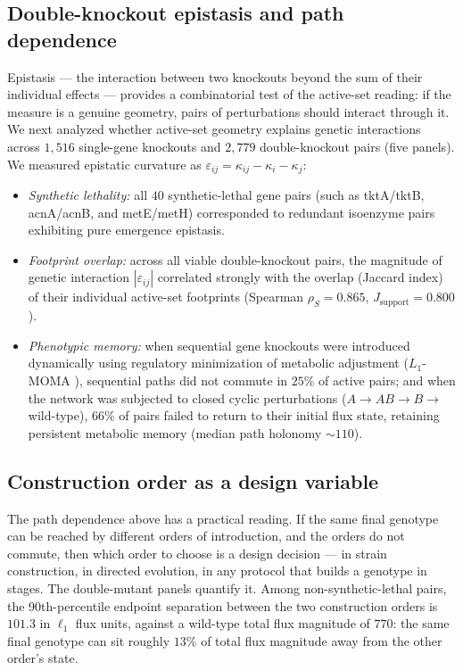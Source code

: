 \documentclass[11pt,a4paper]{article}
\theoremstyle{plain}
\theoremstyle{definition}
\theoremstyle{remark}
\begin{document}
\subsection{Double-knockout epistasis and path dependence}
Epistasis --- the interaction between two knockouts beyond the sum of
their individual effects --- provides a combinatorial test of the
active-set reading: if the measure is a genuine geometry, pairs of
perturbations should interact through it. We next analyzed whether
active-set geometry explains genetic interactions across $1{,}516$
single-gene knockouts and $2{,}779$ double-knockout pairs (five
panels). We measured epistatic curvature as
$\varepsilon_{ij} = \kappa_{ij} - \kappa_i - \kappa_j$:
\begin{itemize}
\item \emph{Synthetic lethality:} all $40$ synthetic-lethal gene pairs
      (such as tktA/tktB, acnA/acnB, and metE/metH) corresponded to
      redundant isoenzyme pairs exhibiting pure emergence epistasis.
\item \emph{Footprint overlap:} across all viable double-knockout
      pairs, the magnitude of genetic interaction $|\varepsilon_{ij}|$
      correlated strongly with the overlap (Jaccard index) of their
      individual active-set footprints (Spearman $\rho_S = 0.865$,
      $J_{\mathrm{support}} = 0.800$).
\item \emph{Phenotypic memory:} when sequential gene knockouts were
      introduced dynamically using regulatory minimization of
      metabolic adjustment ($L_1$-MOMA \citep{segre2002}), sequential
      paths did not commute in $25\%$ of active pairs; and when the
      network was subjected to closed cyclic perturbations
      ($A \to AB \to B \to$ wild-type), $66\%$ of pairs failed to
      return to their initial flux state, retaining persistent
      metabolic memory (median path holonomy $\sim 110$).
\end{itemize}

\subsection{Construction order as a design variable}\label{sec:order}

The path dependence above has a practical reading. If the same
final genotype can be reached by different orders of introduction,
and the orders do not commute, then which order to choose is a
design decision --- in strain construction, in directed evolution,
in any protocol that builds a genotype in stages. The
double-mutant panels quantify it. Among non-synthetic-lethal
pairs, the 90th-percentile endpoint separation between the two
construction orders is $101.3$ in $\ell_1$ flux units, against a
wild-type total flux magnitude of $770$: the same final genotype
can sit roughly $13\%$ of total flux magnitude away from the other
order's state.
\end{document}
